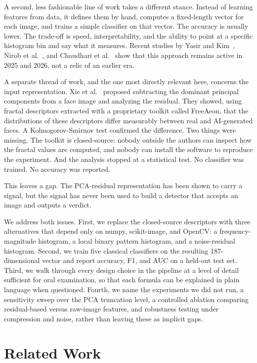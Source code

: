 \documentclass[runningheads]{llncs}
\begin{document}
A second, less fashionable line of work takes a different stance. Instead of learning features from data, it defines them by hand, computes a fixed-length vector for each image, and trains a simple classifier on that vector. The accuracy is usually lower. The trade-off is speed, interpretability, and the ability to point at a specific histogram bin and say what it measures. Recent studies by Yasir and Kim~\cite{yasir2025}, Nirob et al.~\cite{nirob2026}, and Chaudhari et al.~\cite{chaudhari2026} show that this approach remains active in 2025 and 2026, not a relic of an earlier era.

A separate thread of work, and the one most directly relevant here, concerns the input representation. Xie et al.~\cite{xie2026} proposed subtracting the dominant principal components from a face image and analyzing the residual. They showed, using fractal descriptors extracted with a proprietary toolkit called FreeAeon, that the distributions of these descriptors differ measurably between real and AI-generated faces. A Kolmogorov-Smirnov test confirmed the difference. Two things were missing. The toolkit is closed-source: nobody outside the authors can inspect how the fractal values are computed, and nobody can install the software to reproduce the experiment. And the analysis stopped at a statistical test. No classifier was trained. No accuracy was reported.

This leaves a gap. The PCA-residual representation has been shown to carry a signal, but the signal has never been used to build a detector that accepts an image and outputs a verdict.

We address both issues. First, we replace the closed-source descriptors with three alternatives that depend only on numpy, scikit-image, and OpenCV: a frequency-magnitude histogram, a local binary pattern histogram, and a noise-residual histogram. Second, we train five classical classifiers on the resulting 187-dimensional vector and report accuracy, F1, and AUC on a held-out test set. Third, we walk through every design choice in the pipeline at a level of detail sufficient for oral examination, so that each formula can be explained in plain language when questioned. Fourth, we name the experiments we did not run, a sensitivity sweep over the PCA truncation level, a controlled ablation comparing residual-based versus raw-image features, and robustness testing under compression and noise, rather than leaving these as implicit gaps.


\section{Related Work}
\end{document}
